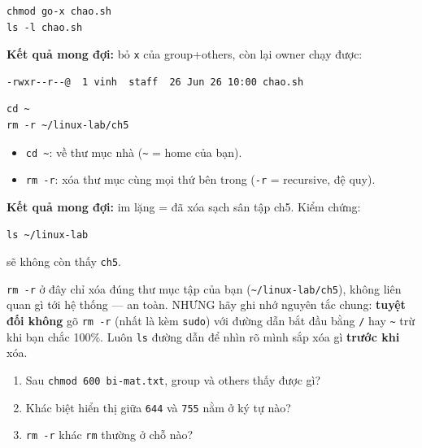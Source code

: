 \documentclass[12pt,a4paper]{article}
\newcommand{\cmd}[1]{\texttt{#1}}
\begin{document}
\begin{labbox}
\begin{Verbatim}
chmod go-x chao.sh
ls -l chao.sh
\end{Verbatim}
\textbf{Kết quả mong đợi:} bỏ \cmd{x} của group+others, còn lại owner chạy được:
\begin{Verbatim}
-rwxr--r--@  1 vinh  staff  26 Jun 26 10:00 chao.sh
\end{Verbatim}
\end{labbox}

\begin{labbox}
\begin{Verbatim}
cd ~
rm -r ~/linux-lab/ch5
\end{Verbatim}
\begin{itemize}
\item \cmd{cd \textasciitilde}: về thư mục nhà (\cmd{\textasciitilde} = home của bạn).
\item \cmd{rm -r}: xóa thư mục cùng mọi thứ bên trong (\cmd{-r} = recursive, đệ quy).
\end{itemize}
\textbf{Kết quả mong đợi:} im lặng = đã xóa sạch sân tập ch5. Kiểm chứng:
\begin{Verbatim}
ls ~/linux-lab
\end{Verbatim}
sẽ không còn thấy \cmd{ch5}.
\end{labbox}

\begin{warnbox}
\cmd{rm -r} ở đây chỉ xóa đúng thư mục tập của bạn
(\cmd{\textasciitilde/linux-lab/ch5}), không liên quan gì tới hệ thống --- an toàn.
NHƯNG hãy ghi nhớ nguyên tắc chung: \textbf{tuyệt đối không} gõ \cmd{rm -r} (nhất là
kèm \cmd{sudo}) với đường dẫn bắt đầu bằng \cmd{/} hay \cmd{\textasciitilde} trừ khi
bạn chắc 100\%. Luôn \cmd{ls} đường dẫn để nhìn rõ mình sắp xóa gì \textbf{trước
khi} xóa.
\end{warnbox}

\begin{checkbox}
\begin{enumerate}
\item Sau \cmd{chmod 600 bi-mat.txt}, group và others thấy được gì?
\item Khác biệt hiển thị giữa \cmd{644} và \cmd{755} nằm ở ký tự nào?
\item \cmd{rm -r} khác \cmd{rm} thường ở chỗ nào?
\end{enumerate}
\end{checkbox}
\end{document}
